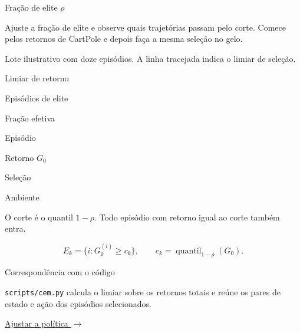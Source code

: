 Fração de elite $\rho$ 

Ajuste a fração de elite e observe quais trajetórias passam pelo corte. Comece pelos retornos de CartPole e depois faça a mesma seleção no gelo.

Lote ilustrativo com doze episódios. A linha tracejada indica o limiar de seleção.

Limiar de retorno

Episódios de elite

Fração efetiva

Episódio

Retorno $G_0$

Seleção

Ambiente

O corte é o quantil $1-\rho$. Todo episódio com retorno igual ao corte também entra.

\[E_k=\{i:G_0^{(i)}\geq c_k\},\qquad c_k=\operatorname{quantil}_{1-\rho}(G_0).\]

Correspondência com o código

\texttt{scripts/cem.py} calcula o limiar sobre os retornos totais e reúne os pares de estado e ação dos episódios selecionados.

\href{politica.html}{Ajustar a política $\rightarrow$}
